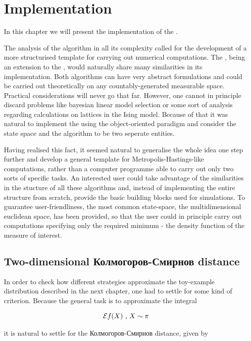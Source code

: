 \chapter{ Implementation }

In this chapter we will present the implementation of the \PT. 

The analysis of the algorithm in all its complexity called for the development of a more structurised template for carrying out numerical computations. The \PT, being an extension to the \MH, would naturally share many similarities in its implementation. Both algorithms can have very abstract formulations and could be carried out theoretically on any countably-generated measurable space. Practical considerations will never go that far. However, one cannot in principle discard problems like bayesian linear model selection or some sort of analysis regarding calculations on lattices in the Ising model. Because of that it was natural to implement the \PT using the object-oriented paradigm and consider the state space and the algorithm to be two seperate entities. 

Having realised this fact, it seemed natural to generalise the whole idea one step further and develop a general template for Metropolis-Hastings-like computations, rather than a computer programme able to carry out only two sorts of specific tasks. An interested user could take advantage of the similarities in the stucture of all these algorithms and, instead of implementing the entire structure from scratch, provide the basic building blocks used for simulations. To guarantee user-friendliness, the most common state-space, the multidimensional euclidean space, has been provided, so that the user could in principle carry out computations specifying only the required minimum - the density function of the measure of interest.


\section{Two-dimensional Колмогоров-Смирнов distance}

In order to check how different strategies approximate the toy-example distribution described in the next chapter, one had to settle for some kind of criterion. Because the general task is to approximate the integral 

$$ \mathcal{E} f( X ) \text{  ,  } X \sim \pi$$

it is natural to settle for the Колмогоров-Смирнов distance, given by 

